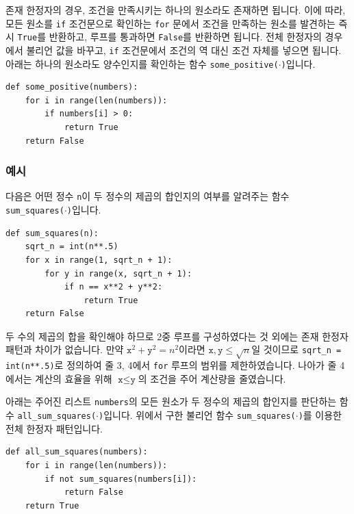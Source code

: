 \documentclass[../main.tex]{subfiles}
\begin{document}
존재 한정자의 경우, 조건을 만족시키는 하나의 원소라도 존재하면 됩니다.
이에 따라, 모든 원소를 \texttt{if} 조건문으로 확인하는 \texttt{for} 문에서 조건을 만족하는 원소를 발견하는 즉시 \texttt{True}를 반환하고, 루프를 통과하면 \texttt{False}를 반환하면 됩니다.
전체 한정자의 경우에서 불리언 값을 바꾸고, \texttt{if} 조건문에서 조건의 역 대신 조건 자체를 넣으면 됩니다.
아래는 하나의 원소라도 양수인지를 확인하는 함수 \texttt{some\_positive($\cdot$)}입니다.
\begin{verbatim}
def some_positive(numbers):
	for i in range(len(numbers)):
		if numbers[i] > 0:
			return True
	return False
\end{verbatim}

\subsubsection{예시}
다음은 어떤 정수 \texttt{n}이 두 정수의 제곱의 합인지의 여부를 알려주는 함수 \texttt{sum\_squares($\cdot$)}입니다.
\begin{verbatim}
def sum_squares(n):
	sqrt_n = int(n**.5)
	for x in range(1, sqrt_n + 1):
		for y in range(x, sqrt_n + 1):
			if n == x**2 + y**2:
				return True
	return False
\end{verbatim}
두 수의 제곱의 합을 확인해야 하므로 2중 루프를 구성하였다는 것 외에는 존재 한정자 패턴과 차이가 없습니다.
만약 $\texttt{x}^2 + \texttt{y}^2 = n^2$이라면 $\texttt{x}, \texttt{y} \leq \sqrt n$일 것이므로 \texttt{sqrt\_n = int(n**.5)}로 정의하여 줄 3, 4에서 \texttt{for} 루프의 범위를 제한하였습니다.
나아가 줄 4에서는 계산의 효율을 위해 $\texttt{x} \leq \texttt{y}$의 조건을 주어 계산량을 줄였습니다.

아래는 주어진 리스트 \texttt{numbers}의 모든 원소가 두 정수의 제곱의 합인지를 판단하는 함수 \texttt{all\_sum\_squares($\cdot$)}입니다.
위에서 구한 불리언 함수 \texttt{sum\_squares($\cdot$)}를 이용한 전체 한정자 패턴입니다.
\begin{verbatim}
def all_sum_squares(numbers):
	for i in range(len(numbers)):
		if not sum_squares(numbers[i]):
			return False
	return True
\end{verbatim}
\end{document}
